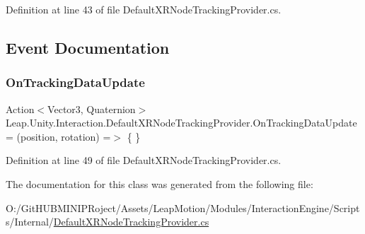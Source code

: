Definition at line 43 of file Default\+X\+R\+Node\+Tracking\+Provider.\+cs.



\subsection{Event Documentation}
\mbox{\label{class_leap_1_1_unity_1_1_interaction_1_1_default_x_r_node_tracking_provider_a46cfa24510d32bd6db4f29b676ab7490}} 
\subsubsection{\texorpdfstring{OnTrackingDataUpdate}{OnTrackingDataUpdate}}
{\footnotesize\ttfamily Action$<$Vector3, Quaternion$>$ Leap.\+Unity.\+Interaction.\+Default\+X\+R\+Node\+Tracking\+Provider.\+On\+Tracking\+Data\+Update = (position, rotation) =$>$ \{ \}}



Definition at line 49 of file Default\+X\+R\+Node\+Tracking\+Provider.\+cs.



The documentation for this class was generated from the following file\+:\begin{DoxyCompactItemize}
\item 
O\+:/\+Git\+H\+U\+B\+M\+I\+N\+I\+P\+Roject/\+Assets/\+Leap\+Motion/\+Modules/\+Interaction\+Engine/\+Scripts/\+Internal/\mbox{\hyperlink{_default_x_r_node_tracking_provider_8cs}{Default\+X\+R\+Node\+Tracking\+Provider.\+cs}}\end{DoxyCompactItemize}
